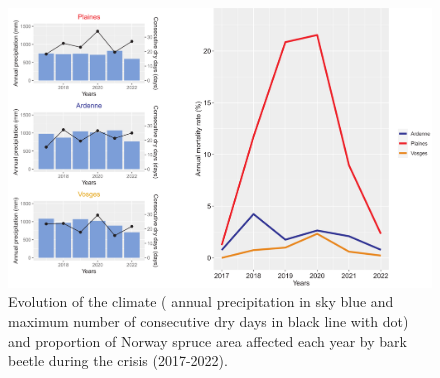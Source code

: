 \documentclass[3p,procedia]{elsarticle}
\begin{document}
\begin{figure}[htbp] 
   \centering
   \includegraphics[width=0.9 \textwidth]{figure_climat_result.png}
    \caption{Evolution of the climate ( annual precipitation in sky blue and  maximum number of consecutive dry days in black line with dot) and proportion of Norway spruce area affected each year by bark beetle during the crisis (2017-2022).}
    \label{evol_gen}
\end{figure}

    
\end{document}
